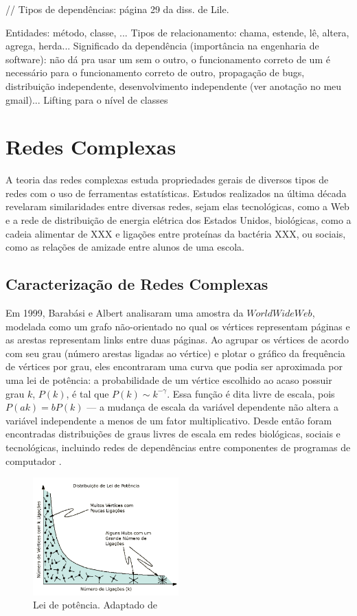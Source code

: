 \documentclass{article}
\begin{document}
// Tipos de dependências: página 29 da diss. de Lile.

Entidades: método, classe, ...
Tipos de relacionamento: chama, estende, lê, altera, agrega, herda...
Significado da dependência (importância na engenharia de software): não dá pra usar um sem o outro, o funcionamento correto de um é necessário para o funcionamento correto de outro, propagação de bugs, distribuição independente, desenvolvimento independente (ver anotação no meu gmail)...
Lifting para o nível de classes

\section{Redes Complexas}

A teoria das redes complexas estuda propriedades gerais de diversos tipos de redes com o uso de ferramentas estatísticas. Estudos realizados na última década revelaram similaridades entre diversas redes, sejam elas tecnológicas, como a Web e a rede de distribuição de energia elétrica dos Estados Unidos, biológicas, como a cadeia alimentar de XXX e ligações entre proteínas da bactéria XXX, ou sociais, como as relações de amizade entre alunos de uma escola.

\subsection{Caracterização de Redes Complexas}

Em 1999, Barabási e Albert \cite{Barabasi1999} analisaram uma amostra da $World Wide Web$, modelada como um grafo não-orientado no qual os vértices representam páginas e as arestas representam links entre duas páginas. Ao agrupar os vértices de acordo com seu grau (número arestas ligadas ao vértice) e plotar o gráfico da frequência de vértices por grau, eles encontraram uma curva que podia ser aproximada por uma lei de potência: a probabilidade de um vértice escolhido ao acaso possuir grau $k$, $P(k)$, é tal que $P(k) \sim k^{-\gamma}$. Essa função é dita livre de escala, pois $P(ak) = bP(k)$ --- a mudança de escala da variável dependente não altera a variável independente a menos de um fator multiplicativo. Desde então foram encontradas distribuições de graus livres de escala em redes biológicas, sociais e tecnológicas, incluindo redes de dependências entre componentes de programas de computador \cite{Valverde2003}.

\begin{figure}
\centering
\includegraphics[width=0.5\textwidth]{leidepotencia}
\caption{Lei de potência. Adaptado de \cite{Barabasi2007}}
\end{figure}
\end{document}
